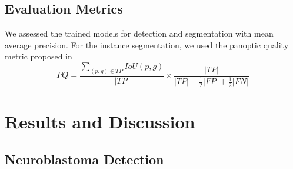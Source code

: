 \documentclass[journal]{IEEEtran}
\begin{document}
\subsection{Evaluation Metrics}
We assessed the trained models for detection and segmentation with mean average precision. For the instance segmentation, we used the panoptic quality metric proposed in %
\begin{equation}
PQ = \frac{\sum_{(p,g)\in TP}IoU(p,g)}{|TP|} \times \frac{|TP|}{|TP| + \frac{1}{2}|FP| + \frac{1}{2}|FN|}
\end{equation}
\section{Results and Discussion}
\subsection{Neuroblastoma Detection}
\end{document}
